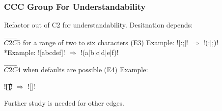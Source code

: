 

\begin{frame}[fragile]
\frametitle{CCC Group For Understandability}

\begin{center}
Refactor out of C2 for understandability.  Desitnation depends:
\end{center}

\begin{block}{$\overrightarrow{C2 C5}$ for a range of two to six characters (E3)}
Example: \cverb![:;]! $\Rightarrow$ \cverb!(:|;)!
\\*Example: \cverb![abcdef]! $\Rightarrow$ \cverb!(a|b|c|d|e|f)!
\end{block}

\begin{block}{$\overrightarrow{C2 C4}$ when defaults are possible (E4)}
Example: \begin{footnotesize}\cverb![\t\n\r\c\v ]! $\Rightarrow$ \cverb![\s]!\end{footnotesize}
\end{block}

\begin{center}
Further study is needed for other edges.
\end{center}

\end{frame}




